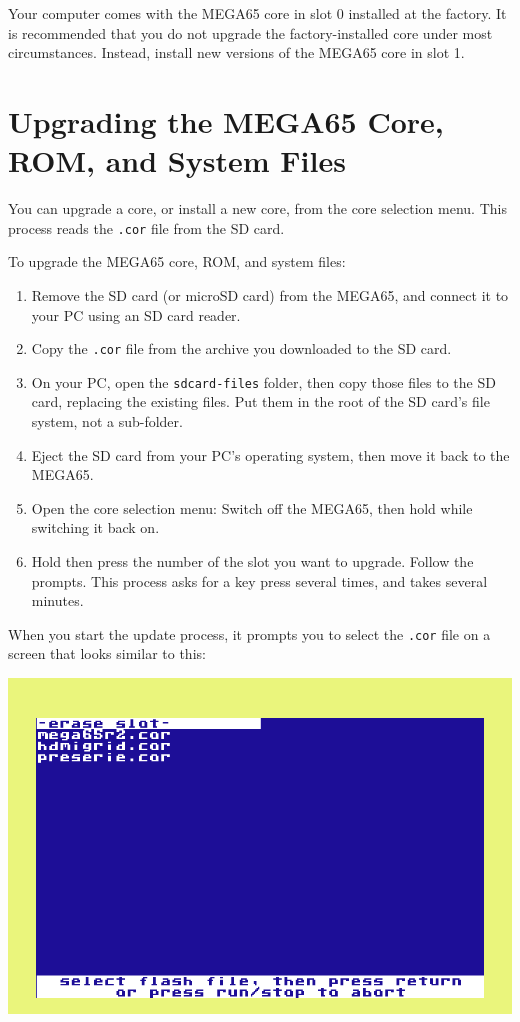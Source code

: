 Your computer comes with the MEGA65 core in slot 0 installed at the factory. It is recommended that you do not upgrade the factory-installed core under most circumstances. Instead, install new versions of the MEGA65 core in slot 1.

\section{Upgrading the MEGA65 Core, ROM, and System Files}

You can upgrade a core, or install a new core, from the core selection menu. This process reads the {\tt .cor} file from the SD card.

To upgrade the MEGA65 core, ROM, and system files:

\begin{enumerate}
  \item Remove the SD card (or microSD card) from the MEGA65, and connect it to your PC using an SD card reader.
  \item Copy the {\tt .cor} file from the archive you downloaded to the SD card.
  \item On your PC, open the {\tt sdcard-files} folder, then copy those files to the SD card, replacing the existing files. Put them in the root of the SD card's file system, not a sub-folder.
  \item Eject the SD card from your PC's operating system, then move it back to the MEGA65.
  \item Open the core selection menu: Switch off the MEGA65, then hold  while switching it back on.
  \item Hold  then press the number of the slot you want to upgrade. Follow the prompts. This process asks for a key press several times, and takes several minutes.
\end{enumerate}

When you start the update process, it prompts you to select the {\tt .cor} file on a screen that looks similar to this:

\begin{center}
  \includegraphics[width=0.7\linewidth]{images/ss-flashmenu-selectcore.png}
\end{center}


